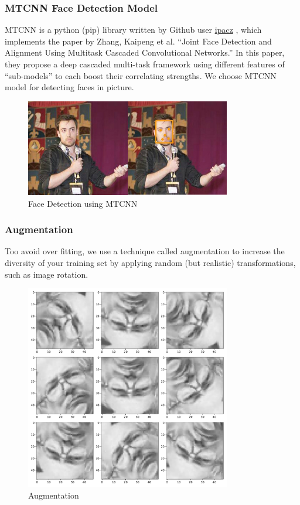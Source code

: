 \documentclass[11pt,a4paper]{article}
\begin{document}
    \subsubsection{MTCNN Face Detection Model}
    MTCNN is a python (pip) library written by Github user \href{https://github.com/ipazc/mtcnn}{ipacz} \cite{MTCNN}, which implements the paper by Zhang, Kaipeng et al. “Joint Face Detection and Alignment Using Multitask Cascaded Convolutional Networks.” \cite{1604.02878} In this paper, they propose a deep cascaded multi-task framework using different features of “sub-models” to each boost their correlating strengths. We choose MTCNN model for detecting faces in picture.
    \begin{figure}[H]
        \centering
        \includegraphics[width = 0.8\textwidth]{written_report/pictures/mtcnn.jpg}
        \caption{Face Detection using MTCNN}
        \label{fig:MTCNN}
    \end{figure}
    
    \subsubsection{Augmentation}
    Too avoid over fitting, we use a technique called augmentation to increase the diversity of your training set by applying random (but realistic) transformations, such as image rotation.
    \begin{figure}[H]
        \centering
        \includegraphics[width = 0.8\textwidth]{emotion_detection/plot/augmentation.pdf}
        \caption{Augmentation}
        \label{fig:augmentation}
    \end{figure}
    
\end{document}
